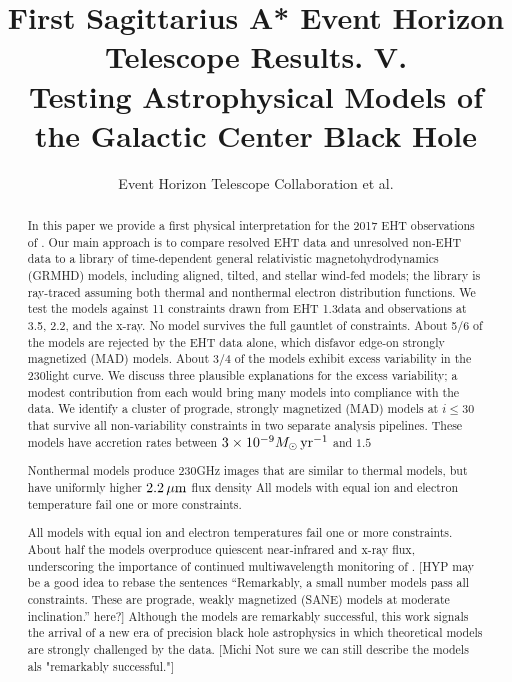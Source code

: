 \documentclass[twocolumn,twocolappendix,tighten,dvipsnames,linenumbers]{aastex63}
\renewcommand\comment[3]{{\color{#1}[#2 #3]}}
\newcommand\hyp[1]{{\comment{Salmon}{HYP}{#1}}}
\newcommand\michi[1]{{\comment{Brown}{Michi}{#1}}}
\begin{document}
\title{First Sagittarius A* Event Horizon Telescope Results. V.\\
  Testing Astrophysical Models of the Galactic Center Black Hole}

%
\author{Event Horizon Telescope Collaboration et al.}


\received{\today}
\revised{\today}

\begin{abstract}

  In this paper we provide a first physical interpretation for the
  2017 EHT observations of \sgra.
  Our main approach is to compare resolved EHT data and unresolved
  non-EHT data to a library of time-dependent general relativistic
  magnetohydrodynamics (GRMHD) models, including aligned, tilted, and
  stellar wind-fed models; the library is ray-traced assuming both
  thermal and nonthermal electron distribution functions.
  We test the models against 11 constraints drawn from EHT
  1.3\mm data and observations at 3.5\mm, 2.2\um, and the x-ray.
  No model survives the full gauntlet of constraints. About 5/6 of the models are rejected by the EHT data alone, which disfavor edge-on strongly magnetized (MAD) models.  About 3/4 of the models exhibit excess variability in the 230\GHz light curve.  We discuss three plausible explanations for the excess variability; a modest contribution from each would bring many models into compliance with the data.  We identify a cluster of prograde, strongly magnetized (MAD) models at $i \le 30$ that survive all non-variability constraints in two separate analysis pipelines.  These models have accretion rates between $3\times 10^{-9} M_\odot \,\mathrm{yr}^{-1}$ and $1.5$

  Nonthermal models produce 230GHz images that are similar to thermal models, but have uniformly higher $2.2\,\mu\mathrm{m}$ flux density
  All models with equal ion and electron temperature fail one or more constraints.

  All models with equal ion and electron temperatures fail one or more
  constraints.
  About half the models overproduce quiescent near-infrared and x-ray
  flux, underscoring the importance of continued multiwavelength
  monitoring of \sgra.
  \hyp{may be a good idea to rebase the sentences ``Remarkably, a
    small number models pass all constraints.
    These are prograde, weakly magnetized (SANE) models at moderate
    inclination.'' here?}
  Although the models are remarkably successful, this work signals the
  arrival of a new era of precision black hole astrophysics in which
  theoretical models are strongly challenged by the data.
  \michi{Not sure we can still describe the models als "remarkably successful."}
\end{abstract}
\end{document}
